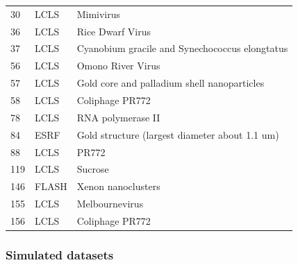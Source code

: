 \begin{table}
\begin{tabularx}{\textwidth}{ l l X }
            30       & LCLS         & Mimivirus                                                       \\
            36       & LCLS         & Rice Dwarf Virus                                                \\
            37       & LCLS         & Cyanobium gracile and Synechococcus elongtatus                  \\
            56       & LCLS         & Omono River Virus                                               \\
            57       & LCLS         & Gold core and palladium shell nanoparticles                     \\
            58       & LCLS         & Coliphage PR772                                                 \\
            78       & LCLS         & RNA polymerase II                                               \\
            84       & ESRF         & Gold structure (largest diameter about 1.1 um)                  \\
            88       & LCLS         & PR772                                                           \\
            119      & LCLS         & Sucrose                                                         \\
            146      & FLASH        & Xenon nanoclusters                                              \\
            155      & LCLS         & Melbournevirus                                                  \\
            156      & LCLS         & Coliphage PR772                                                 \\
        \end{tabularx}
\end{table}


\subsubsection{Simulated datasets}

